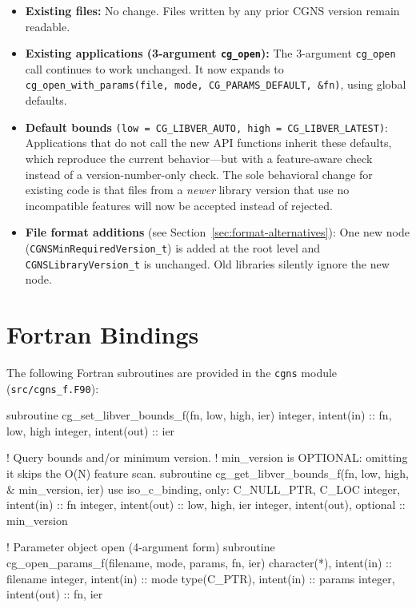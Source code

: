 \documentclass[11pt,letterpaper]{article}
\makeatletter
\let\cgns@orig@lstlisting\lstlisting
\let\cgns@endorig@lstlisting\endlstlisting
\renewenvironment{lstlisting}
  {\par\needspace{5\baselineskip}\nolinenumbers\cgns@orig@lstlisting}
  {\cgns@endorig@lstlisting\par\linenumbers}
\makeatother
\begin{document}
\begin{itemize}[leftmargin=2em]
\item \textbf{Existing files:}  No change.  Files written by any
  prior CGNS version remain readable.
\item \textbf{Existing applications (3-argument \texttt{cg\_open}):}
  The 3-argument \texttt{cg\_open} call continues to work unchanged.
  It now expands to \texttt{cg\_open\_with\_params(file, mode,
  CG\_PARAMS\_DEFAULT, \&fn)}, using global defaults.
\item \textbf{Default bounds}
  \texttt{(low~=~CG\_LIBVER\_AUTO, high~=~CG\_LIBVER\_LATEST)}:
  Applications that do not call the new API functions inherit these
  defaults, which reproduce the current behavior---but with a
  feature-aware check instead of a version-number-only check.  The
  sole behavioral change for existing code is that files from a
  \emph{newer} library version that use no incompatible features will
  now be accepted instead of rejected.
\item \textbf{File format additions} (see
  Section~\ref{sec:format-alternatives}): One new node
  (\texttt{CGNSMinRequiredVersion\_t}) is added at the root level
  and \texttt{CGNSLibraryVersion\_t} is unchanged.  Old libraries
  silently ignore the new node.
\end{itemize}

\section{Fortran Bindings}

The following Fortran subroutines are provided in the \texttt{cgns}
module (\texttt{src/cgns\_f.F90}):

\begin{lstlisting}[language=Fortran]
subroutine cg_set_libver_bounds_f(fn, low, high, ier)
    integer, intent(in)  :: fn, low, high
    integer, intent(out) :: ier

! Query bounds and/or minimum version.
! min_version is OPTIONAL: omitting it skips the O(N) feature scan.
subroutine cg_get_libver_bounds_f(fn, low, high, &
                                        min_version, ier)
    use iso_c_binding, only: C_NULL_PTR, C_LOC
    integer,           intent(in)            :: fn
    integer,           intent(out)           :: low, high, ier
    integer,           intent(out), optional :: min_version

! Parameter object open (4-argument form)
subroutine cg_open_params_f(filename, mode, params, fn, ier)
    character(*),     intent(in)  :: filename
    integer,          intent(in)  :: mode
    type(C_PTR),      intent(in)  :: params
    integer,          intent(out) :: fn, ier
\end{lstlisting}
\end{document}
